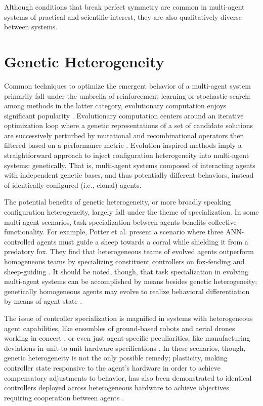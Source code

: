 Although conditions that break perfect symmetry are common in multi-agent systems of practical and scientific interest, they are also qualitatively diverse between systems.

\section{Genetic Heterogeneity}

Common techniques to optimize the emergent behavior of a multi-agent system primarily fall under the umbrella of reinforcement learning or stochastic search; among methods in the latter category, evolutionary computation enjoys significant popularity \cite{panait2005cooperative}.
Evolutionary computation centers around an iterative optimization loop where a genetic representations of a set of candidate solutions are successively perturbed by mutational and recombinational operators then filtered based on a performance metric \cite{fogel2000evolutionary}.
Evolution-inspired methods imply a straightforward approach to inject configuration heterogeneity into multi-agent systems: genetically.
That is, multi-agent systems composed of interacting agents with independent genetic bases, and thus potentially different behaviors, instead of identically configured (i.e., clonal) agents.

The potential benefits of genetic heterogeneity, or more broadly speaking configuration heterogeneity, largely fall under the theme of specialization.
In some multi-agent scenarios, task specialization between agents benefits collective functionality.
For example, Potter et al. present a scenario where three ANN-controlled agents must guide a sheep towards a corral while shielding it from a predatory fox.
They find that heterogeneous teams of evolved agents outperform homogeneous teams by specializing constituent controllers on fox-fending and sheep-guiding \cite{potter2001heterogeneity}.
It should be noted, though, that task specialization in evolving multi-agent systems can be accomplished by means besides genetic heterogeneity;
genetically homogeneous agents may evolve to realize behavioral differentiation by means of agent state \cite{ferrante2015evolution}.

The issue of controller specialization is magnified in systems with heterogeneous agent capabilities, like ensembles of ground-based robots and aerial drones working in concert \cite{gomes2015cooperative, mathews2012supervised}, or even just agent-specific peculiarities, like manufacturing deviations in unit-to-unit hardware specifications \cite{pugh2007parallel, duarte2016evolution}.
In these scenarios, though, genetic heterogeneity is not the only possible remedy;
plasticity, making controller state responsive to the agent's hardware in order to achieve compensatory adjustments to behavior, has also been demonstrated to identical controllers deployed across heterogeneous hardware to achieve objectives requiring cooperation between agents \cite{tuci2008evolving}.

